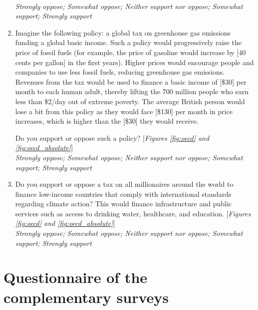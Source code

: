 \begin{enumerate}
\\ \textit{Strongly oppose; Somewhat oppose; Neither support nor oppose; Somewhat support; Strongly support}
\item Imagine the following policy: a global tax on greenhouse gas emissions funding a global basic income. 
Such a policy would progressively raise the price of fossil fuels (for example, the price of gasoline would increase by [40 cents per gallon] in the first years). Higher prices would encourage people and companies to use less fossil fuels, reducing greenhouse gas emissions. Revenues from the tax would be used to finance a basic income of [\$30] per month to each human adult, thereby lifting the 700 million people who earn less than \$2/day out of extreme poverty. 
The average British person would lose a bit from this policy as they would face [\$130] per month in price increases, which is higher than the [\$30] they would receive.

Do you support or oppose such a policy?  [\textit{Figures \ref{fig:oecd} and \ref{fig:oecd_absolute}}]
\\ \textit{Strongly oppose; Somewhat oppose; Neither support nor oppose; Somewhat support; Strongly support}
\item \label{q:millionaire_tax} Do you support or oppose a tax on all millionaires around the world to finance low-income countries that comply with international standards regarding climate action? 
This would finance infrastructure and public services such as access to drinking water, healthcare, and education. [\textit{Figures \ref{fig:oecd} and \ref{fig:oecd_absolute}}]
\\ \textit{Strongly oppose; Somewhat oppose; Neither support nor oppose; Somewhat support; Strongly support}
\end{enumerate}



\renewcommand{\theenumi}{\arabic{enumi}}
\clearpage
\section{Questionnaire of the complementary surveys}\label{app:questionnaire}




